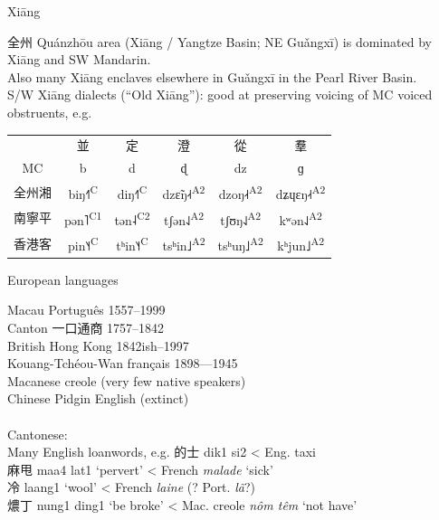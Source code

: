 \documentclass{beamer}
\begin{document}
\begin{frame}[fragile]{Xiāng}

全州 Quánzhōu area (Xiāng / Yangtze Basin; NE Guǎngxī) is dominated by Xiāng and SW Mandarin.\\
Also many Xiāng enclaves elsewhere in Guǎngxī in the Pearl River Basin.\\
\medskip
S/W Xiāng dialects (\enquote{Old Xiāng}): good at preserving voicing of MC voiced obstruents, e.g.\\

\bigskip
\begin{tabular}{c|c c c c c}
     & 並 & 定 & 澄 & 從 & 羣\\
    MC & b & d & ɖ & dz & ɡ\\ \hline
    全州湘 & biŋ˧˥\textsuperscript{C} & diŋ˧˥\textsuperscript{C} & dzɛ̃ŋ˨˧\textsuperscript{A2} & dzoŋ˨˧\textsuperscript{A2} & dʑɥɛŋ˨˧\textsuperscript{A2}\\
    南寧平 & pən˥\textsuperscript{C1} & tən˨\textsuperscript{C2} & tʃən˨˩\textsuperscript{A2} & tʃʊŋ˨˩\textsuperscript{A2} & kʷən˨˩\textsuperscript{A2}\\
    香港客 & pin˥˧\textsuperscript{C} & tʰin˥˧\textsuperscript{C} & tsʰin˩\textsuperscript{A2} & tsʰuŋ˩\textsuperscript{A2} & kʰjun˩\textsuperscript{A2}\\
\end{tabular}

\end{frame}

\begin{frame}[fragile]{European languages}

Macau Português 1557–1999\\
Canton 一口通商 1757–1842\\
British Hong Kong 1842ish–1997\\
Kouang-Tchéou-Wan français 1898—1945\\
\medskip
Macanese creole (very few native speakers)\\
Chinese Pidgin English (extinct)\\
 \\  
\medskip
Cantonese:\\
Many English loanwords, e.g. 的士 dik1 si2 < Eng. taxi\\
麻甩 maa4 lat1 \enquote*{pervert} < French \textit{malade} \enquote*{sick}\\
冷 laang1 \enquote*{wool} < French \textit{laine} (? Port. \textit{lã}?)\\
燶丁 nung1 ding1 \enquote*{be broke} < Mac. creole \textit{nôm têm} \enquote*{not have}\\

\end{frame}
\end{document}
